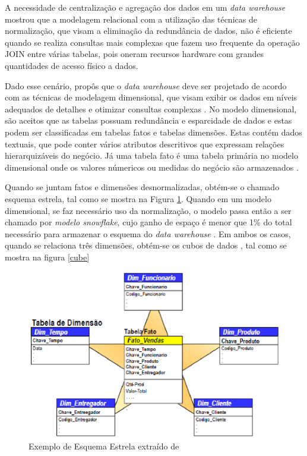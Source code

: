 A necessidade de centralização e agregação dos dados em um \textit{data warehouse} mostrou que a modelagem relacional com a utilização das técnicas de normalização, que visam a eliminação da redundância de dados, não é eficiente quando se realiza consultas mais complexas que fazem uso frequente da operação JOIN entre várias tabelas, pois oneram recursos hardware com grandes quantidades de acesso físico a dados. \cite{Kimball2002}

Dado esse cenário,  propôs que o \textit{data warehouse} deve ser projetado de acordo com as técnicas de modelagem dimensional, que visam exibir os dados em níveis adequados de detalhes e otimizar consultas complexas \cite{valeria2012}. No modelo dimensional, são aceitos que as tabelas possuam redundância e esparcidade de dados e estas podem ser classificadas em tabelas fatos e tabelas dimensões. Estas contém dados textuais, que pode conter vários atributos descritivos que expressam relações hierarquizáveis do negócio. Já uma tabela fato é uma tabela primária no modelo dimensional onde os valores númericos ou medidas do negócio são armazenados \cite{Kimball2002}. 


Quando se juntam fatos e dimensões desnormalizadas, obtém-se o chamado esquema estrela, tal como se mostra na Figura \ref{estrela}. Quando em um modelo dimensional, se faz necessário uso da normalização, o modelo passa então a ser chamado por \textit{modelo snowflake}, cujo ganho de espaço é menor que 1\% do total necessário para armazenar o esquema do \textit{data warehouse} . Em ambos os casos, quando se relaciona três dimensões, obtém-se os cubos de dados \cite{Kimball2002}, tal como se mostra na figura \ref{cube}


\begin{figure}[h!]
\centering
\includegraphics[keepaspectratio=false,scale=0.85]{figuras/star_schema.eps}
\caption{Exemplo de Esquema Estrela extraído de }
\label{estrela}
\end{figure}
\FloatBarrier


